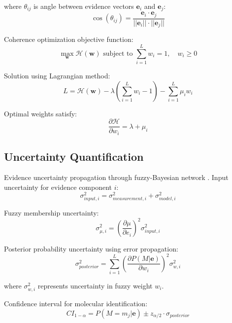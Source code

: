 where $\theta_{ij}$ is angle between evidence vectors $\mathbf{e}_i$ and $\mathbf{e}_j$:
\begin{equation}
\cos(\theta_{ij}) = \frac{\mathbf{e}_i \cdot \mathbf{e}_j}{||\mathbf{e}_i|| \cdot ||\mathbf{e}_j||}
\end{equation}

Coherence optimization objective function:
\begin{equation}
\max_{\mathbf{w}} \mathcal{H}(\mathbf{w}) \text{ subject to } \sum_{i=1}^L w_i = 1, \quad w_i \geq 0
\end{equation}

Solution using Lagrangian method:
\begin{equation}
L = \mathcal{H}(\mathbf{w}) - \lambda \left(\sum_{i=1}^L w_i - 1\right) - \sum_{i=1}^L \mu_i w_i
\end{equation}

Optimal weights satisfy:
\begin{equation}
\frac{\partial \mathcal{H}}{\partial w_i} = \lambda + \mu_i
\end{equation}

\subsection{Uncertainty Quantification}

Evidence uncertainty propagation through fuzzy-Bayesian network \cite{klir1995fuzzy}. Input uncertainty for evidence component $i$:
\begin{equation}
\sigma_{input,i}^2 = \sigma_{measurement,i}^2 + \sigma_{model,i}^2
\end{equation}

Fuzzy membership uncertainty:
\begin{equation}
\sigma_{\mu,i}^2 = \left(\frac{\partial \mu}{\partial e_i}\right)^2 \sigma_{input,i}^2
\end{equation}

Posterior probability uncertainty using error propagation:
\begin{equation}
\sigma_{posterior}^2 = \sum_{i=1}^L \left(\frac{\partial P(M|\mathbf{e})}{\partial w_i}\right)^2 \sigma_{w,i}^2
\end{equation}

where $\sigma_{w,i}^2$ represents uncertainty in fuzzy weight $w_i$.

Confidence interval for molecular identification:
\begin{equation}
CI_{1-\alpha} = P(M = m_j | \mathbf{e}) \pm z_{\alpha/2} \cdot \sigma_{posterior}
\end{equation}

